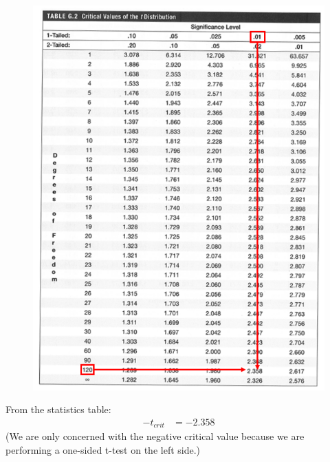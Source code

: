 \documentclass[12pt]{report}
\begin{document}
\begin{figure}[H]
	\centering
	\includegraphics{tute6_q2_4}
\end{figure}
\vspace{-\baselineskip}
\noindent From the statistics table: \begin{align*}
-t_{crit} &= -2.358 
\end{align*} (We are only concerned with the negative critical value because we are performing a one-sided t-test on the left side.)
\end{document}
